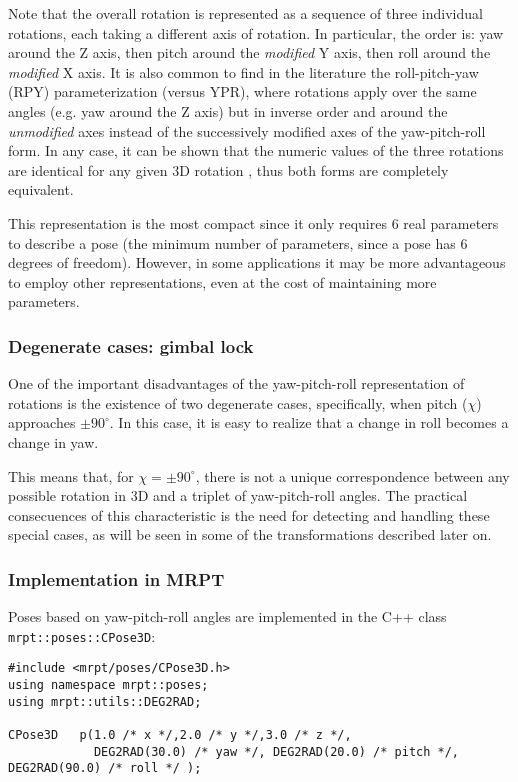 \documentclass[a4paper,11pt]{report}
\begin{document}
Note that the overall rotation is represented as a sequence of three individual rotations,
each taking a different axis of rotation.
In particular, the order is: yaw around the Z axis, then pitch around the \emph{modified} Y axis,
then roll around the \emph{modified} X axis. It is also common to find in the literature
the roll-pitch-yaw (RPY) parameterization (versus YPR), where rotations apply over the same angles (e.g. yaw
around the Z axis) but in inverse order and around the \emph{unmodified} axes instead of
the successively modified axes of the yaw-pitch-roll form. In any case, it can be shown that
the numeric values of the three rotations are identical for any given 3D rotation \cite{madrigal2012slambook},
thus both forms are completely equivalent.

This representation is the most compact since it only requires 6 real parameters
to describe a pose (the minimum number of parameters, since a pose has 6 degrees of freedom).
However, in some applications it may be more advantageous to employ other representations,
even at the cost of maintaining more parameters.


\subsubsection{Degenerate cases: gimbal lock}
\label{sect:ypr:gimbal}

One of the important disadvantages of the yaw-pitch-roll representation of rotations is the existence
of two degenerate cases, specifically, when pitch ($\chi$) approaches $\pm 90^\circ$. In this case,
it is easy to realize that a change in roll becomes a change in yaw.

This means that, for $ \chi = \pm 90^\circ$, there is not a unique correspondence between any possible
rotation in 3D and a triplet of yaw-pitch-roll angles.
The practical consecuences of this characteristic is the need for detecting and handling these
special cases, as will be seen in some of the transformations described later on.


\subsubsection{Implementation in MRPT}

Poses based on yaw-pitch-roll angles are implemented in the C++ class \texttt{mrpt::poses::CPose3D}:

\begin{lstlisting}
#include <mrpt/poses/CPose3D.h>
using namespace mrpt::poses;
using mrpt::utils::DEG2RAD;

CPose3D   p(1.0 /* x */,2.0 /* y */,3.0 /* z */,
            DEG2RAD(30.0) /* yaw */, DEG2RAD(20.0) /* pitch */, DEG2RAD(90.0) /* roll */ );
\end{lstlisting}
\end{document}
